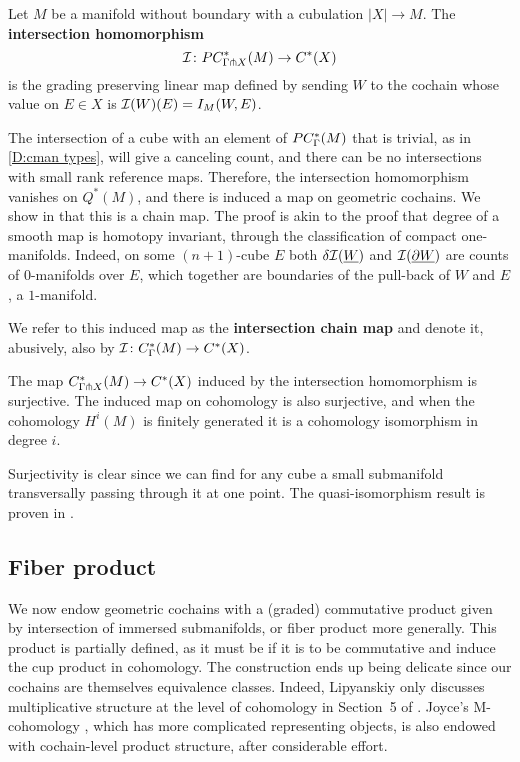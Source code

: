 \begin{definition}\label{D:intersection homomorphism}
	Let $M$ be a manifold without boundary with a cubulation $|X| \to M$.
	The \textbf{intersection homomorphism}
	\begin{equation*}
		\mathcal{I} \colon PC^*_{\Gamma \pitchfork X}(M) \to C^{\ast}(X)
	\end{equation*}
	is the grading preserving linear map defined by sending $W$ to the cochain whose value on $E \in X$ is $\mathcal{I}(W)(E) = I_M(W, E)$.
\end{definition}

The intersection of a cube with an element of $PC_\Gamma^*(M)$ that is trivial, as in \cref{D:cman types}, will give a canceling count, and there can be no intersections with small rank reference maps.
Therefore, the intersection homomorphism vanishes on $Q^*(M)$, and there is induced a map on geometric cochains.
We show in \cite[Proposition 6.14]{medina2022foundations} that this is a chain map.
The proof is akin to the proof that degree of a smooth map is homotopy invariant, through the classification of compact one-manifolds.
Indeed, on some $(n+1)$-cube $E$ both $\delta \mathcal{I}(\underline{W})$ and $\mathcal{I}(\underline{\partial W})$ are counts of $0$-manifolds over $E$, which together are boundaries of the pull-back of $W$ and $E$, a $1$-manifold.

We refer to this induced map as the \textbf{intersection chain map} and denote it, abusively, also by $\mathcal{I} \colon C_\Gamma^*(M)\to C^*(X)$.

\begin{theorem}\label{T:stokes}
	The map $C^*_{\Gamma \pitchfork X}(M) \to C^{\ast}(X)$ induced by the intersection homomorphism is  surjective.
	The induced map on cohomology is also surjective, and when the cohomology $H^i(M)$ is finitely generated it is a cohomology isomorphism in degree $i$.
\end{theorem}

Surjectivity is clear since we can find for any cube a small submanifold transversally passing through it at one point.
The quasi-isomorphism result is proven in \cite[Theorem 6.21]{medina2022foundations}.

\subsection{Fiber product}\label{S:fiber product section}

We now endow geometric cochains with a (graded) commutative product given by intersection of immersed submanifolds, or fiber product more generally.
This product is partially defined, as it must be if it is to be commutative and induce the cup product in cohomology.
The construction ends up being delicate since our cochains are themselves equivalence classes.
Indeed, Lipyanskiy only discusses multiplicative structure at the level of cohomology in Section~5 of \cite{Lipy14}.
Joyce's M-cohomology \cite{Joyc15}, which has more complicated representing objects, is also endowed with cochain-level product structure, after considerable effort.

